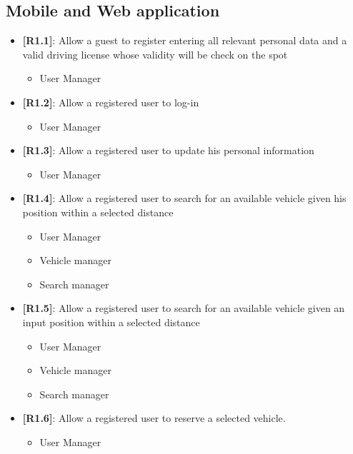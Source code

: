 \subsection{Mobile and Web application}
\begin{itemize}
	\item{\textbf{[R1.1]}}: Allow a guest to register entering all relevant personal data and a valid driving license whose validity will be check on the spot\\
	\begin{itemize}
	\item User Manager
	\end{itemize}
	\item{\textbf{[R1.2]}}: Allow a registered user to log-in\\
	\begin{itemize}
	\item User Manager
	\end{itemize}
	\item{\textbf{[R1.3]}}: Allow a registered user to update his personal information\\
	\begin{itemize}
	\item User Manager
	\end{itemize}
	\item{\textbf{[R1.4]}}: Allow a registered user to search for an available vehicle given his position within a selected distance\\
	\begin{itemize}
	\item User Manager
	\item Vehicle manager
	\item Search manager
	\end{itemize}
	\item{\textbf{[R1.5]}}: Allow a registered user to search for an available vehicle given an input position within a selected distance\\
	\begin{itemize}
	\item User Manager
	\item Vehicle manager
	\item Search manager
	\end{itemize}
	\item{\textbf{[R1.6]}}: Allow a registered user to reserve a selected vehicle.\\
	\begin{itemize}
	\item User Manager

\end{itemize}
\end{itemize}
